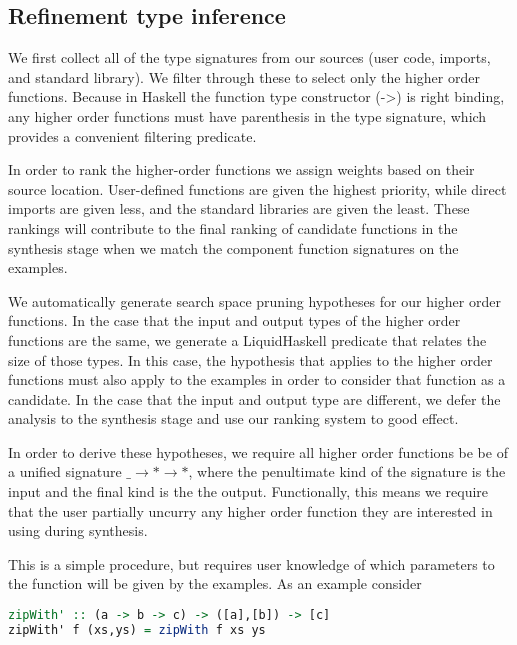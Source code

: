\subsection{Refinement type inference}

We first collect all of the type signatures from our sources (user code, imports, and standard library). We filter through these to select only the higher order functions. Because in Haskell the function type constructor (->) is right binding, any higher order functions must have parenthesis in the type signature, which provides a convenient filtering predicate.

In order to rank the higher-order functions we assign weights based on their source location. User-defined functions are given the highest priority, while direct imports are given less, and the standard libraries are given the least. These rankings will contribute to the final ranking of candidate functions in the synthesis stage when we match the component function signatures on the examples.


We automatically generate search space pruning hypotheses for our higher order functions.
In the case that the input and output types of the higher order functions are the same, we generate a LiquidHaskell predicate that relates the size of those types.
In this case, the hypothesis that applies to the higher order functions must also apply to the examples in order to consider that function as a candidate.
In the case that the input and output type are different, we defer the analysis to the synthesis stage and use our ranking system to good effect.

In order to derive these hypotheses, we require all higher order functions be be of a unified signature \texttt{$\_ \to * \to *$}, where the penultimate kind of the signature is the input and the final kind is the the output.  Functionally, this means we require that the user partially uncurry any higher order function they are interested in using during synthesis.

This is a simple procedure, but requires user knowledge of which parameters to the function will be given by the examples. 
As an example consider 

\begin{lstlisting}[language=haskell]
zipWith' :: (a -> b -> c) -> ([a],[b]) -> [c]
zipWith' f (xs,ys) = zipWith f xs ys
\end{lstlisting}



